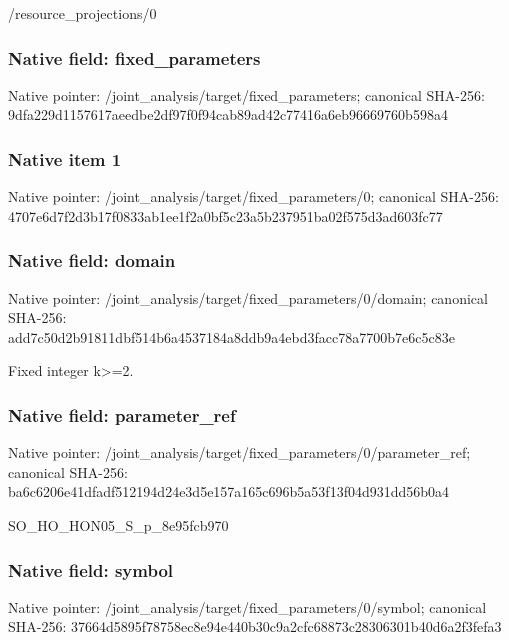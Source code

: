 \documentclass[10pt,a4paper]{article}
\begin{document}
\begingroup\raggedright\sloppy /\allowbreak{}resource\_\allowbreak{}projections/\allowbreak{}0\par\endgroup

\subsubsection{Native field: fixed\_\allowbreak{}parameters}
Native pointer: /joint\_\allowbreak{}analysis/target/fixed\_\allowbreak{}parameters; canonical SHA-256: 9dfa229d1157617aeedbe2df97f0f94cab89ad42c77416a6eb96669760b598a4

\subsubsection{Native item 1}
Native pointer: /joint\_\allowbreak{}analysis/target/fixed\_\allowbreak{}parameters/0; canonical SHA-256: 4707e6d7f2d3b17f0833ab1ee1f2a0bf5c23a5b237951ba02f575d3ad603fc77

\subsubsection{Native field: domain}
Native pointer: /joint\_\allowbreak{}analysis/target/fixed\_\allowbreak{}parameters/0/domain; canonical SHA-256: add7c50d2b91811dbf514b6a4537184a8ddb9a4ebd3facc78a7700b7e6c5c83e

\begingroup\raggedright\sloppy Fixed integer k>=\allowbreak{}2.\par\endgroup

\subsubsection{Native field: parameter\_\allowbreak{}ref}
Native pointer: /joint\_\allowbreak{}analysis/target/fixed\_\allowbreak{}parameters/0/parameter\_\allowbreak{}ref; canonical SHA-256: ba6c6206e41dfadf512194d24e3d5e157a165c696b5a53f13f04d931dd56b0a4

\begingroup\raggedright\sloppy SO\_\allowbreak{}HO\_\allowbreak{}HON05\_\allowbreak{}S\_\allowbreak{}p\_\allowbreak{}8e95fcb970\par\endgroup

\subsubsection{Native field: symbol}
Native pointer: /joint\_\allowbreak{}analysis/target/fixed\_\allowbreak{}parameters/0/symbol; canonical SHA-256: 37664d5895f78758ec8e94e440b30c9a2cfc68873c28306301b40d6a2f3fefa3
\end{document}
